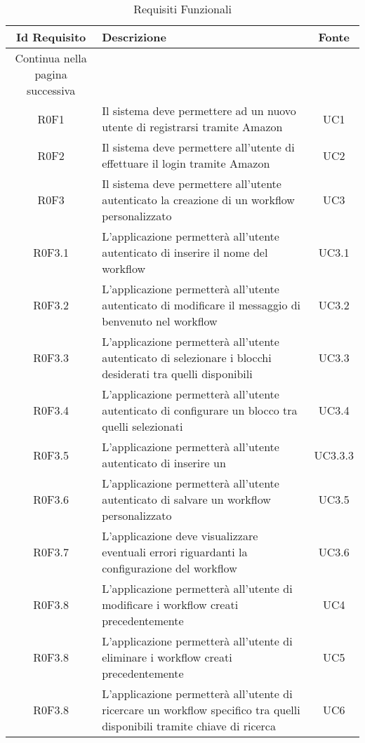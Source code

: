 \begin{center}
\begin{longtable}{cm{8cm}c }
	\rowcolors{3}{tableRow}{}
	\color[HTML]{FFFFFF} \textbf{Id Requisito} & \color[HTML]{FFFFFF} \centering\textbf{Descrizione} & \color[HTML]{FFFFFF} \textbf{Fonte} \\
\endhead
\rowcolor{white}\multicolumn{3}{c}
   { Continua nella pagina successiva} \\
   \endfoot
   \caption [Requisiti Funzionali]{Requisiti Funzionali}
	\label{tabella:reqP1}
   \endlastfoot
	R0F1 & Il sistema deve permettere ad un nuovo utente di registrarsi tramite Amazon  &  UC1 \\ 
	R0F2 & Il sistema deve permettere all'utente di effettuare il login tramite Amazon  & UC2\\ 
	R0F3 & Il sistema deve permettere all'utente autenticato la creazione di un workflow personalizzato & UC3\\
	R0F3.1 & L'applicazione permetterà all'utente autenticato di inserire il nome del workflow  &  UC3.1 \\ 
	R0F3.2 & L'applicazione permetterà all'utente autenticato di modificare il messaggio di benvenuto nel workflow &  UC3.2 \\
	R0F3.3 & L'applicazione permetterà all'utente autenticato di selezionare i blocchi desiderati tra quelli disponibili &  UC3.3 \\
	R0F3.4 & L'applicazione permetterà all'utente autenticato di configurare un blocco tra quelli selezionati &  UC3.4 \\
	R0F3.5 & L'applicazione permetterà all'utente autenticato di inserire un \BFiltro{} &  UC3.3.3 \\
	R0F3.6 & L'applicazione permetterà all'utente autenticato di salvare un workflow personalizzato &  UC3.5 \\
	R0F3.7 & L'applicazione deve visualizzare eventuali errori riguardanti la configurazione del workflow &  UC3.6 \\
	R0F3.8 & L'applicazione permetterà all'utente di modificare i workflow creati precedentemente &  UC4 \\
	R0F3.8 & L'applicazione permetterà all'utente di eliminare i workflow creati precedentemente &  UC5 \\
	R0F3.8 & L'applicazione permetterà all'utente di ricercare un workflow specifico tra quelli disponibili tramite chiave di ricerca &  UC6 \\

\end{longtable}
\end{center}
